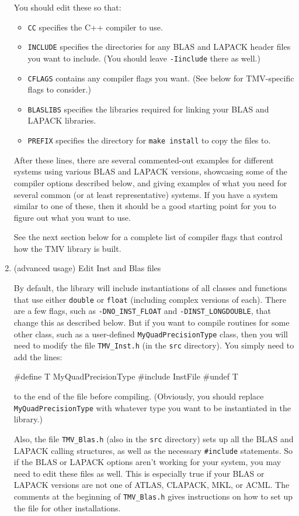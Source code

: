 \documentclass[twoside,letterpaper,11pt]{article}
\renewcommand{\tt}[1]{{\lstinline {#1}}}
\begin{document}
\begin{enumerate}
You should edit these so that:
\begin{itemize}
\item \texttt{CC} specifies the C++ compiler to use.
\item \texttt{INCLUDE} specifies the directories for any BLAS and LAPACK header
files you want to include. (You should leave \tt{-Iinclude} there as well.)
\item \texttt{CFLAGS} contains any compiler flags you want.
(See below for TMV-specific flags to consider.)
\item \texttt{BLASLIBS} specifies the libraries required for linking your BLAS and LAPACK libraries.
\item \texttt{PREFIX} specifies the directory for \texttt{make install} to copy the files to.
\end{itemize}

After these lines, there are several commented-out examples for different systems 
using various BLAS
and LAPACK versions, showcasing some of the compiler options described below,
and giving examples of what you need for several common (or at least representative) systems.
If you have a system similar to one of these, then it should be a good 
starting point for you to figure out what you want to use.

See the next section below for a complete list of compiler flags that control how the TMV library is built.

\item{(advanced usage) Edit Inst and Blas files}

By default, the library will include instantiations of all classes and 
functions
that use either \texttt{double} or \texttt{float} (including complex versions of each).  
There are a few flags, such as 
\texttt{-DNO\_INST\_FLOAT} and \texttt{-DINST\_LONGDOUBLE},
that change this as described below.  
But if you want to compile routines for some other class, such as a user-defined
\texttt{MyQuadPrecisionType} class, then you will need to modify the file \texttt{TMV\_Inst.h} 
(in the \texttt{src} directory).
You simply need to add the lines:
\begin{tmvcode}
#define T MyQuadPrecisionType
#include InstFile
#undef T
\end{tmvcode}
to the end of the file before compiling.  (Obviously, you should
replace \tt{MyQuadPrecisionType} with whatever
type you want to be instantiated in the library.)

Also, the file \texttt{TMV\_Blas.h} (also in the \texttt{src} directory)
sets up all the BLAS and LAPACK calling structures,
as well as the necessary \texttt{\#include} statements.  
So if the BLAS or LAPACK options aren't working 
for your system, you may need to edit these files as well.
This is especially true if your BLAS or LAPACK versions are not one of 
ATLAS, CLAPACK, MKL, or ACML.  The comments at the beginning of 
\texttt{TMV\_Blas.h} gives instructions on how to set up the file for 
other installations.


\end{enumerate}
\end{document}
